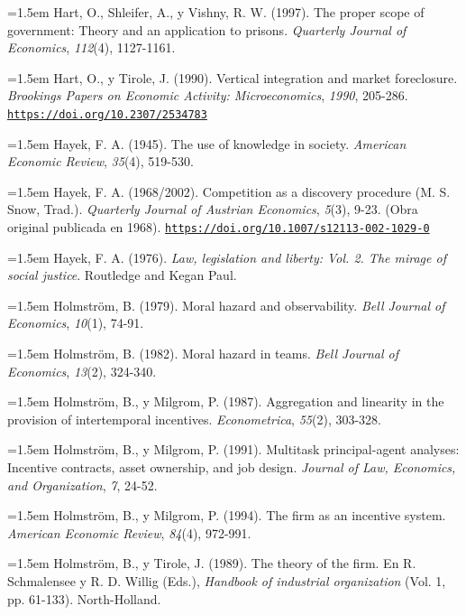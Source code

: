 \documentclass[10pt,a4paper]{article}
\begin{document}
\noindent\hangindent=1.5em Hart, O., Shleifer, A., y Vishny, R. W. (1997). The proper scope of government: Theory and an application to prisons. \textit{Quarterly Journal of Economics}, \textit{112}(4), 1127-1161.

\noindent\hangindent=1.5em Hart, O., y Tirole, J. (1990). Vertical integration and market foreclosure. \textit{Brookings Papers on Economic Activity: Microeconomics}, \textit{1990}, 205-286. \href{https://doi.org/10.2307/2534783}{\nolinkurl{https://doi.org/10.2307/2534783}}

\noindent\hangindent=1.5em Hayek, F. A. (1945). The use of knowledge in society. \textit{American Economic Review}, \textit{35}(4), 519-530.

\noindent\hangindent=1.5em Hayek, F. A. (1968/2002). Competition as a discovery procedure (M. S. Snow, Trad.). \textit{Quarterly Journal of Austrian Economics}, \textit{5}(3), 9-23. (Obra original publicada en 1968). \href{https://doi.org/10.1007/s12113-002-1029-0}{\nolinkurl{https://doi.org/10.1007/s12113-002-1029-0}}

\noindent\hangindent=1.5em Hayek, F. A. (1976). \textit{Law, legislation and liberty: Vol. 2. The mirage of social justice}. Routledge and Kegan Paul.

\noindent\hangindent=1.5em Holmström, B. (1979). Moral hazard and observability. \textit{Bell Journal of Economics}, \textit{10}(1), 74-91.

\noindent\hangindent=1.5em Holmström, B. (1982). Moral hazard in teams. \textit{Bell Journal of Economics}, \textit{13}(2), 324-340.

\noindent\hangindent=1.5em Holmström, B., y Milgrom, P. (1987). Aggregation and linearity in the provision of intertemporal incentives. \textit{Econometrica}, \textit{55}(2), 303-328.

\noindent\hangindent=1.5em Holmström, B., y Milgrom, P. (1991). Multitask principal-agent analyses: Incentive contracts, asset ownership, and job design. \textit{Journal of Law, Economics, and Organization}, \textit{7}, 24-52.

\noindent\hangindent=1.5em Holmström, B., y Milgrom, P. (1994). The firm as an incentive system. \textit{American Economic Review}, \textit{84}(4), 972-991.

\noindent\hangindent=1.5em Holmström, B., y Tirole, J. (1989). The theory of the firm. En R. Schmalensee y R. D. Willig (Eds.), \textit{Handbook of industrial organization} (Vol. 1, pp. 61-133). North-Holland.
\end{document}
